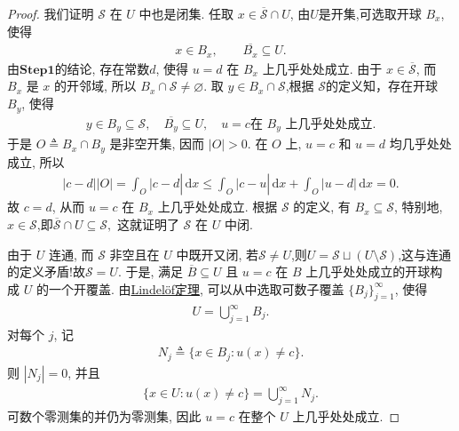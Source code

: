 \documentclass[../../main.tex]{subfiles}
\begin{document}
\begin{proof}
我们证明 $\mathcal{S}$ 在 $U$ 中也是闭集.
任取 $x\in\overline{\mathcal{S}}\cap U$, 由$U$是开集,可选取开球 $B_x$, 使得
\begin{align*}
x\in B_x,\qquad \overline{B_x}\subseteq U.
\end{align*}
由$\mathbf{Step}\mathbf{1}$的结论, 存在常数$d$, 使得 $u=d$ 在 $B_x$ 上几乎处处成立.
由于 $x\in\overline{\mathcal{S}}$, 而 $B_x$ 是 $x$ 的开邻域, 所以
$B_x\cap\mathcal{S}\neq\varnothing$.
取 $y\in B_x\cap\mathcal{S}$,根据 $\mathcal{S}$的定义知，存在开球 $B_y$, 使得
\begin{align*}
y\in B_y\subseteq \mathcal{S},\quad \overline{B_y}\subseteq U,\quad
u=c\text{在 }B_y\text{ 上几乎处处成立}.
\end{align*}
于是 $O\triangleq B_x\cap B_y$ 是非空开集, 因而 $|O|>0$.
在 $O$ 上, $u=c$ 和 $u=d$ 均几乎处处成立, 所以
\begin{align*}
|c-d||O|=\int_O{|c}-d|\,\mathrm{d}x\leqslant \int_O{|c}-u|\,\mathrm{d}x+\int_O{|u}-d|\,\mathrm{d}x=0.
\end{align*}
故 $c=d$, 从而 $u=c$ 在 $B_x$ 上几乎处处成立.
根据 $\mathcal{S}$ 的定义, 有 $B_x\subseteq\mathcal{S}$, 特别地,
$x\in\mathcal{S}$,即$\overline{\mathcal{S}}\cap U\subseteq \mathcal{S},$
这就证明了 $\mathcal{S}$ 在 $U$ 中闭.

由于 $U$ 连通, 而 $\mathcal{S}$ 非空且在 $U$ 中既开又闭, 若$\mathcal{S}\neq U$,则$U=\mathcal{S} \sqcup (U\setminus \mathcal{S})$,这与连通的定义矛盾!故$\mathcal{S}=U.$
于是, 满足 $\overline{B}\subseteq U$ 且 $u=c$ 在 $B$ 上几乎处处成立的开球构成 $U$ 的一个开覆盖.
由\hyperref[Real Analysis-theorem:Lindelöf定理]{Lindelöf定理}, 可以从中选取可数子覆盖
$\{B_j\}_{j=1}^{\infty}$, 使得
\begin{align*}
U=\bigcup\limits_{j=1}^{\infty}B_j.
\end{align*}
对每个 $j$, 记
\begin{align*}
N_j\triangleq\{x\in B_j:u(x)\neq c\}.
\end{align*}
则 $|N_j|=0$, 并且
\begin{align*}
\{x\in U:u(x)\neq c\}
=\bigcup\limits_{j=1}^{\infty}N_j.
\end{align*}
可数个零测集的并仍为零测集, 因此 $u=c$ 在整个 $U$ 上几乎处处成立.
\end{proof}
\end{document}
